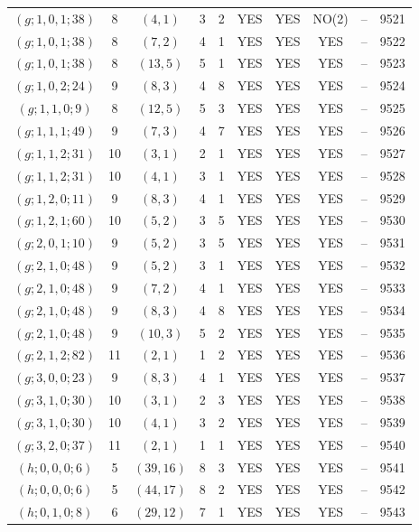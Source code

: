 \begin{longtable}{|c|c|c|c|c|c|c|c|c|c|}
$(g; 1, 0, 1; 38)$ & 8 & $(4, 1)$ & 3 & 2 & YES & YES & NO(2) & -- & 9521\\
$(g; 1, 0, 1; 38)$ & 8 & $(7, 2)$ & 4 & 1 & YES & YES & YES & -- & 9522\\
$(g; 1, 0, 1; 38)$ & 8 & $(13, 5)$ & 5 & 1 & YES & YES & YES & -- & 9523\\
$(g; 1, 0, 2; 24)$ & 9 & $(8, 3)$ & 4 & 8 & YES & YES & YES & -- & 9524\\
$(g; 1, 1, 0; 9)$ & 8 & $(12, 5)$ & 5 & 3 & YES & YES & YES & -- & 9525\\
$(g; 1, 1, 1; 49)$ & 9 & $(7, 3)$ & 4 & 7 & YES & YES & YES & -- & 9526\\
$(g; 1, 1, 2; 31)$ & 10 & $(3, 1)$ & 2 & 1 & YES & YES & YES & -- & 9527\\
$(g; 1, 1, 2; 31)$ & 10 & $(4, 1)$ & 3 & 1 & YES & YES & YES & -- & 9528\\
$(g; 1, 2, 0; 11)$ & 9 & $(8, 3)$ & 4 & 1 & YES & YES & YES & -- & 9529\\
$(g; 1, 2, 1; 60)$ & 10 & $(5, 2)$ & 3 & 5 & YES & YES & YES & -- & 9530\\
$(g; 2, 0, 1; 10)$ & 9 & $(5, 2)$ & 3 & 5 & YES & YES & YES & -- & 9531\\
$(g; 2, 1, 0; 48)$ & 9 & $(5, 2)$ & 3 & 1 & YES & YES & YES & -- & 9532\\
$(g; 2, 1, 0; 48)$ & 9 & $(7, 2)$ & 4 & 1 & YES & YES & YES & -- & 9533\\
$(g; 2, 1, 0; 48)$ & 9 & $(8, 3)$ & 4 & 8 & YES & YES & YES & -- & 9534\\
$(g; 2, 1, 0; 48)$ & 9 & $(10, 3)$ & 5 & 2 & YES & YES & YES & -- & 9535\\
$(g; 2, 1, 2; 82)$ & 11 & $(2, 1)$ & 1 & 2 & YES & YES & YES & -- & 9536\\
$(g; 3, 0, 0; 23)$ & 9 & $(8, 3)$ & 4 & 1 & YES & YES & YES & -- & 9537\\
$(g; 3, 1, 0; 30)$ & 10 & $(3, 1)$ & 2 & 3 & YES & YES & YES & -- & 9538\\
$(g; 3, 1, 0; 30)$ & 10 & $(4, 1)$ & 3 & 2 & YES & YES & YES & -- & 9539\\
$(g; 3, 2, 0; 37)$ & 11 & $(2, 1)$ & 1 & 1 & YES & YES & YES & -- & 9540\\
$(h; 0, 0, 0; 6)$ & 5 & $(39, 16)$ & 8 & 3 & YES & YES & YES & -- & 9541\\
$(h; 0, 0, 0; 6)$ & 5 & $(44, 17)$ & 8 & 2 & YES & YES & YES & -- & 9542\\
$(h; 0, 1, 0; 8)$ & 6 & $(29, 12)$ & 7 & 1 & YES & YES & YES & -- & 9543\\

\end{longtable}

